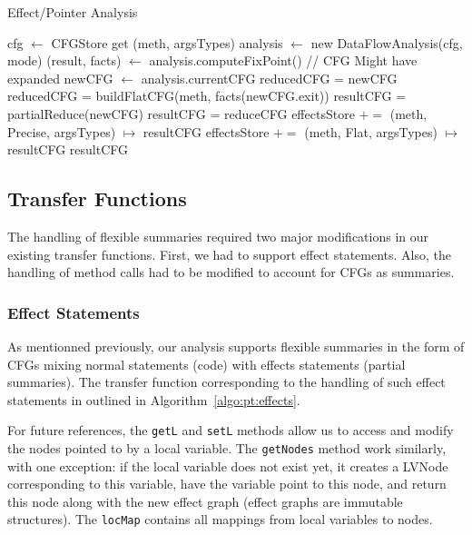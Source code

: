 \documentclass[a4paper]{article}
\begin{document}
\begin{algorithm}
\caption{Effect/Pointer Analysis}\label{algo:pt:analyze}
\begin{algorithmic}[1]
    \State cfg $\gets$ CFGStore get (meth, argsTypes)
    \State analysis $\gets$ new DataFlowAnalysis(cfg, mode)
    \State (result, facts) $\gets$ analysis.computeFixPoint()
    \State // CFG Might have expanded
    \State newCFG $\gets$ analysis.currentCFG
        \State reducedCFG = newCFG
    \Else
        \State reducedCFG = buildFlatCFG(meth, facts(newCFG.exit))
    \EndIf
    \State
        \State resultCFG = partialReduce(newCFG)
    \Else
        \State resultCFG = reduceCFG
    \EndIf
    \State
        \State effectsStore $+=$ (meth, Precise, argsTypes) $\mapsto$ resultCFG
    \EndIf
    \State
        \State effectsStore $+=$ (meth, Flat, argsTypes) $\mapsto$ resultCFG
    \EndIf
    \State
    \State \Return resultCFG
\EndFunction
\end{algorithmic}
\end{algorithm}

\FloatBarrier

\subsection{Transfer Functions}
The handling of flexible summaries required two major modifications in our
existing transfer functions. First, we had to support effect statements.
Also, the handling of method calls had to be modified to account for CFGs as
summaries.

\subsubsection{Effect Statements}
As mentionned previously, our analysis supports flexible summaries in the form
of CFGs mixing normal statements (code) with effects statements (partial
summaries). The transfer function corresponding to the handling of such effect
statements in outlined in Algorithm~\ref{algo:pt:effects}.

For future references, the \verb=getL= and \verb=setL= methods allow us to
access and modify the nodes pointed to by a local variable. The \verb=getNodes=
method work similarly, with one exception: if the local variable does not exist
yet, it creates a LVNode corresponding to this variable, have the variable
point to this node, and return this node along with the new effect graph
(effect graphs are immutable structures). The \verb=locMap= contains all
mappings from local variables to nodes.
\end{document}

